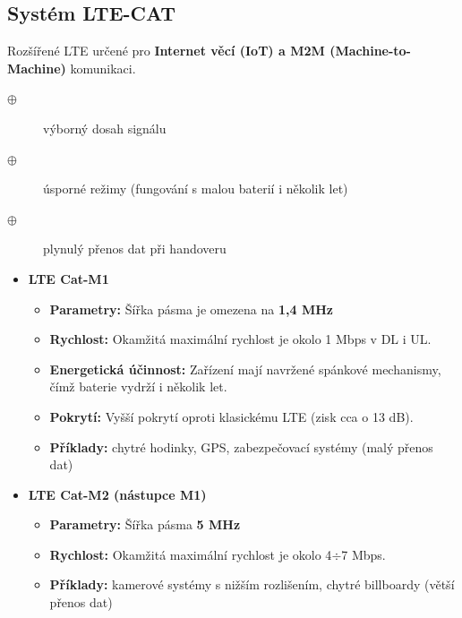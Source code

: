 \subsection{Systém LTE-CAT}
Rozšířené LTE určené pro \textbf{Internet věcí (IoT) a M2M (Machine-to-Machine)} komunikaci.\\
	\begin{description}	
	\item[$\oplus$] výborný dosah signálu
	\item[$\oplus$] úsporné režimy (fungování s malou baterií i několik let)
	\item[$\oplus$] plynulý přenos dat při handoveru
\end{description}

\begin{itemize}	
	\item \textbf{LTE Cat-M1}
	\begin{itemize}	
		\item \textbf{Parametry:} Šířka pásma je omezena na \textbf{1,4 MHz}
		\item \textbf{Rychlost:} Okamžitá maximální rychlost je okolo 1 Mbps v DL i UL.
		\item \textbf{Energetická účinnost:} Zařízení mají navržené spánkové mechanismy, čímž baterie vydrží i několik let.
		\item \textbf{Pokrytí:} Vyšší pokrytí oproti klasickému LTE (zisk cca o 13 dB).
		\item \textbf{Příklady:} chytré hodinky, GPS, zabezpečovací systémy (malý přenos dat)
	\end{itemize}
	\item \textbf{LTE Cat-M2 (nástupce M1)}
	\begin{itemize}	
		\item \textbf{Parametry:} Šířka pásma \textbf{5 MHz}
		\item \textbf{Rychlost:} Okamžitá maximální rychlost je okolo 4$\div$7 Mbps.
		\item \textbf{Příklady:} kamerové systémy s nižším rozlišením, chytré billboardy (větší přenos dat)
	\end{itemize}
\end{itemize}
